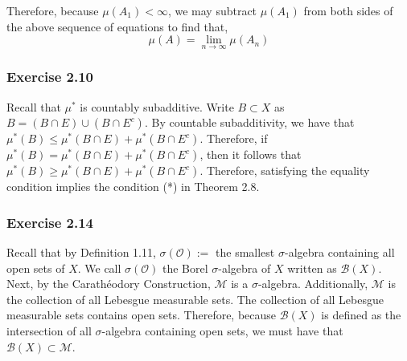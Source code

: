 \documentclass[letterpaper,12pt]{article}
\theoremstyle{definition}
\begin{document}
Therefore, because $\mu(A_1) < \infty$, we may subtract $\mu(A_1)$ from both sides of the above sequence of equations to find that,
\begin{equation}
  \mu(A) = \lim_{n \rightarrow \infty} \mu(A_n)
\end{equation}

\subsubsection*{Exercise 2.10}

Recall that $\mu^*$ is countably subadditive. Write $B \subset X$ as $B = (B \cap E) \cup (B \cap E^c)$. By countable subadditivity, we have that $\mu^*(B) \leq \mu^*(B \cap E) + \mu^*(B \cap E^c)$. Therefore, if $\mu^*(B) = \mu^*(B \cap E) + \mu^*(B \cap E^c)$, then it follows that $\mu^*(B) \geq \mu^*(B \cap E) + \mu^*(B \cap E^c)$. Therefore, satisfying the equality condition implies the condition (*) in Theorem 2.8.

\subsubsection*{Exercise 2.14}
Recall that by Definition 1.11, $\sigma(\mathcal{O}) :=$ the smallest $\sigma$-algebra containing all open sets of $X$. We call $\sigma(\mathcal{O})$ the Borel $\sigma$-algebra of $X$ written as $\mathcal{B}(X)$. Next, by the Carath\'eodory Construction, $\mathcal{M}$ is a $\sigma$-algebra. Additionally, $\mathcal{M}$ is the collection of all Lebesgue measurable sets. The collection of all Lebesgue measurable sets contains open sets. Therefore, because $\mathcal{B}(X)$ is defined as the intersection of all $\sigma$-algebra containing open sets, we must have that $\mathcal{B}(X) \subset \mathcal{M}$.
\end{document}
